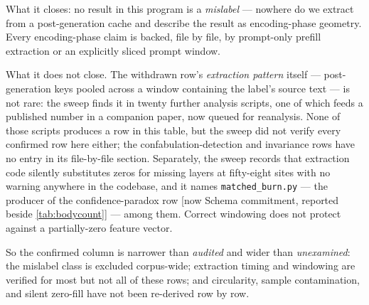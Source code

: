 \documentclass[11pt,a4paper]{article}
\begin{document}
What it closes: no result in this program is a \emph{mislabel} --- nowhere do we
extract from a post-generation cache and describe the result as encoding-phase
geometry. Every encoding-phase claim is backed, file by file, by prompt-only
prefill extraction or an explicitly sliced prompt window.

What it does not close. The withdrawn row's \emph{extraction pattern} itself
--- post-generation keys pooled across a window containing the label's source
text --- is not rare: the sweep finds it in twenty further analysis scripts, one
of which feeds a published number in a companion paper, now queued for
reanalysis. None of those scripts produces a row in this table, but the sweep
did not verify every confirmed row here either; the confabulation-detection and
invariance rows have no entry in its file-by-file section. Separately, the sweep
records that extraction code silently substitutes zeros for missing layers at
fifty-eight sites with no warning anywhere in the codebase, and it names
\texttt{matched\_burn.py} --- the producer of the confidence-paradox row [now
Schema commitment, reported beside \cref{tab:bodycount}] ---
among them. Correct windowing does not protect against a partially-zero feature
vector.

So the confirmed column is narrower than \emph{audited}
and wider than \emph{unexamined}: the mislabel class is excluded corpus-wide;
extraction timing and windowing are verified for most but not all of these rows;
and circularity, sample contamination, and silent zero-fill have not been
re-derived row by row.
\end{document}
